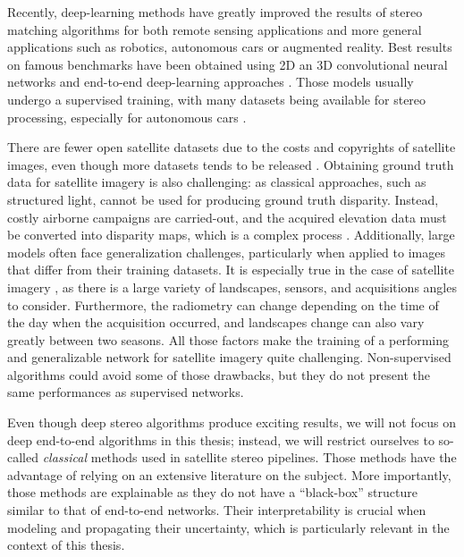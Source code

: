 Recently, deep-learning methods have greatly improved the results of stereo matching algorithms for both remote sensing applications \cite{chebbi_deepsim-nets_2023} and more general applications \cite{tosi_survey_2024} such as robotics, autonomous cars or augmented reality. Best results on famous benchmarks have been obtained using 2D an 3D convolutional neural networks and end-to-end deep-learning approaches \cite{guo_openstereo_2024, liu_playing_2024}. Those models usually undergo a supervised training, with many datasets being available for stereo processing, especially for autonomous cars \cite{geiger_are_2012, geiger_vision_2013}.

There are fewer open satellite datasets due to the costs and copyrights of satellite images, even though more datasets tends to be released \cite{bosch_semantic_2018, le_saux_data_2019, huang_urban_2022}. Obtaining ground truth data for satellite imagery is also challenging: as classical approaches, such as structured light, cannot be used for producing ground truth disparity. Instead, costly airborne campaigns are carried-out, and the acquired elevation data must be converted into disparity maps, which is a complex process \cite{cournet_ground_2020}. Additionally, large models often face generalization challenges, particularly when applied to images that differ from their training datasets. It is especially true in the case of satellite imagery \cite{mari_disparity_2022, jiang_rethinking_2024}, as there is a large variety of landscapes, sensors, and acquisitions angles to consider. Furthermore, the radiometry can change depending on the time of the day when the acquisition occurred, and landscapes change can also vary greatly between two seasons. All those factors make the training of a performing and generalizable network for satellite imagery quite challenging. Non-supervised algorithms could avoid some of those drawbacks, but they do not present the same performances as supervised networks.

Even though deep stereo algorithms produce exciting results, we will not focus on deep end-to-end algorithms in this thesis; instead, we will restrict ourselves to so-called \textit{classical} methods used in satellite stereo pipelines. Those methods have the advantage of relying on an extensive literature on the subject. More importantly, those methods are explainable as they do not have a ``black-box'' structure similar to that of end-to-end networks. Their interpretability is crucial when modeling and propagating their uncertainty, which is particularly relevant in the context of this thesis.

